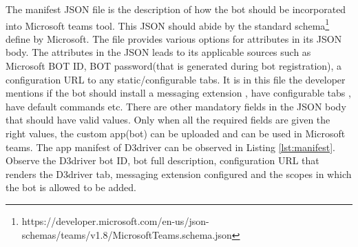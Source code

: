 The manifest JSON file is the description of how the bot should be incorporated into Microsoft teams tool. This JSON should abide by the standard schema\footnote{https://developer.microsoft.com/en-us/json-schemas/teams/v1.8/MicrosoftTeams.schema.json} define by Microsoft. The file provides various options for attributes in its JSON body. The attributes in the JSON leads to its applicable sources such as Microsoft BOT ID, BOT password(that is generated during bot registration), a configuration URL to any static/configurable tabs. It is in this file the developer mentions if the bot should install a messaging extension , have configurable tabs , have default commands etc. There are other mandatory fields in the JSON body that should have valid values. Only when all the required fields are given the right values, the custom app(bot) can be uploaded and can be used in Microsoft teams. The app manifest of D3driver can be observed in Listing \ref{lst:manifest}. Observe the D3driver bot ID, bot full description, configuration URL that renders the D3driver tab, messaging extension configured and the scopes in which the bot is allowed to be added. 


